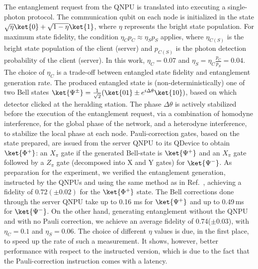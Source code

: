 The entanglement request from the \ac{QNPU} is translated into executing a single-photon protocol. The communication qubit on each node is initialized in the state $\sqrt{\eta} \ket{0} + \sqrt{1-\eta} \ket{1}$, where $\eta$ represents the bright state population. For maximum state fidelity, the condition $\eta_C p_C \approx \eta_S p_S$ applies, where $\eta_{C(S)}$ is the bright state population of the client (server) and $p_{C(S)}$ is the photon detection probability of the client (server). In this work, $\eta_{C}=0.07$ and $\eta_S = \eta_C \frac{p_C}{p_S} = 0.04$. The choice of $\eta_C$ is a trade-off between entangled state fidelity and entanglement generation rate. The produced entangled state is (non-deterministically) one of two Bell states $\ket{\Psi^\pm} = \frac{1}{\sqrt{2}}(\ket{01} \pm e^{i\Delta\theta}\ket{10})$, based on which detector clicked at the heralding station. The phase $\Delta\theta$ is actively stabilized~\cite{pompili_2021_multinode} before the execution of the entanglement request, via a combination of homodyne interference, for the global phase of the network, and a heterodyne interference, to stabilize the local phase at each node. Pauli-correction gates, based on the state prepared, are issued from the server \ac{QNPU} to its \ac{QDevice} to obtain $\ket{\Phi^+}$: an $X_{\pi}$ gate if the generated Bell-state is $\ket{\Psi^+}$ and an $X_{\pi}$ gate followed by a $Z_{\pi}$ gate (decomposed into X and Y gates) for $\ket{\Psi^-}$. As preparation for the experiment, we verified the entanglement generation, instructed by the \acp{QNPU} and using the same method as in Ref.~\cite{pompili_2022_experimental}, achieving a fidelity of $0.72(\pm 0.02)$ for the $\ket{\Phi^+}$ state. The Bell corrections done through the server \ac{QNPU} take up to 0.16 ms for $\ket{\Psi^+}$ and up to 0.49\,ms for $\ket{\Psi^-}$. On the other hand, generating entanglement without the \ac{QNPU} and with no Pauli correction, we achieve an average fidelity of 0.74($\pm$0.03), with $\eta_{C}=0.1$ and $\eta_S=0.06$. The choice of different $\eta$ values is due, in the first place, to speed up the rate of such a measurement. It shows, however, better performance with respect to the instructed version, which is due to the fact that the Pauli-correction instruction comes with a latency.
